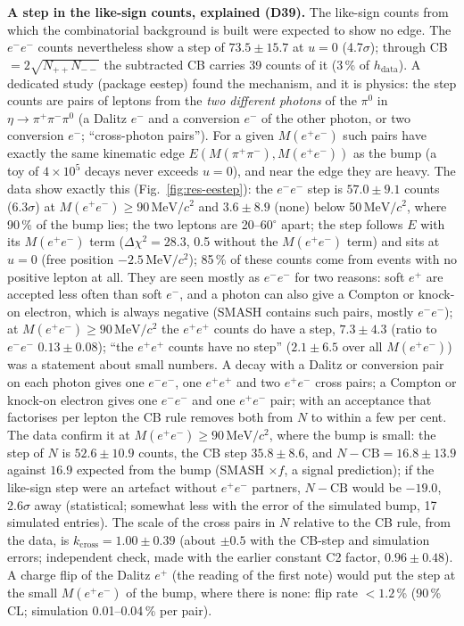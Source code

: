 \documentclass[11pt,a4paper]{article}
\newcommand{\piz}{\ensuremath{\pi^{0}}\xspace}
\newcommand{\pipi}{\ensuremath{\pi^{+}\pi^{-}}\xspace}
\newcommand{\Mee}{\ensuremath{M(e^{+}e^{-})}\xspace}
\newcommand{\Mpipi}{\ensuremath{M(\pi^{+}\pi^{-})}\xspace}
\newcommand{\MeVcc}{\ensuremath{\mathrm{MeV}/c^{2}}\xspace}
\begin{document}
\textbf{A step in the like-sign counts, explained (D39).} The like-sign counts from which the combinatorial background is built were expected to
show no edge. The $e^-e^-$ counts nevertheless show a step of $73.5\pm15.7$ at $u=0$ (4.7$\sigma$); through CB $=2\sqrt{N_{++}N_{--}}$ the
subtracted CB carries 39 counts of it (3\,\% of $h_{\mathrm{data}}$). A dedicated study (package eestep) found the mechanism, and it is physics:
the step counts are pairs of leptons from the \emph{two different photons} of the \piz in $\eta\to\pipi\piz$ (a Dalitz $e^-$ and a conversion
$e^-$ of the other photon, or two conversion $e^-$; ``cross-photon pairs''). For a given \Mee such pairs have exactly the same kinematic edge
$E(\Mpipi,\Mee)$ as the bump (a toy of $4\times10^5$ decays never exceeds $u=0$), and near the edge they are heavy. The data show exactly this
(Fig.~\ref{fig:res-eestep}): the $e^-e^-$ step is $57.0\pm9.1$ counts (6.3$\sigma$) at \Mee$\ge90$\,\MeVcc and $3.6\pm8.9$ (none) below
50\,\MeVcc, where 90\,\% of the bump lies; the two leptons are 20--60$^\circ$ apart; the step follows $E$ with its \Mee term ($\Delta\chi^2=28.3$,
0.5 without the \Mee term) and sits at $u=0$ (free position $-2.5$\,\MeVcc); 85\,\% of these counts come from events with no positive lepton at all.
They are seen mostly as $e^-e^-$ for two reasons: soft $e^+$ are accepted less often than soft $e^-$, and a photon can also give a Compton or
knock-on electron, which is always negative (SMASH contains such pairs, mostly $e^-e^-$); at \Mee$\ge90$\,\MeVcc the $e^+e^+$ counts do have a
step, $7.3\pm4.3$ (ratio to $e^-e^-$ $0.13\pm0.08$); ``the $e^+e^+$ counts have no step'' ($2.1\pm6.5$ over all \Mee) was a statement about
small numbers. A decay with a Dalitz or conversion pair on each photon
gives one $e^-e^-$, one $e^+e^+$ and two $e^+e^-$ cross pairs; a Compton or knock-on electron gives one $e^-e^-$ and one $e^+e^-$ pair; with
an acceptance that factorises per lepton the CB rule removes both from $N$ to within a few per cent. The data confirm
it at \Mee$\ge90$\,\MeVcc, where the bump is small: the step of $N$ is $52.6\pm10.9$ counts, the CB step $35.8\pm8.6$, and
$N-\mathrm{CB}=16.8\pm13.9$ against $16.9$ expected from the bump (SMASH $\times f$, a signal prediction); if the like-sign step were an artefact
without $e^+e^-$ partners, $N-\mathrm{CB}$ would be $-19.0$, 2.6$\sigma$ away (statistical; somewhat less with the error of the simulated bump,
17 simulated entries). The scale of the cross pairs in $N$ relative to the CB rule, from the data, is $k_{\mathrm{cross}}=1.00\pm0.39$ (about
$\pm0.5$ with the CB-step and simulation errors; independent check, made with the earlier constant C2 factor, $0.96\pm0.48$). A charge flip of the Dalitz $e^+$ (the reading of the first note) would put the step at the small \Mee of the
bump, where there is none: flip rate $<1.2$\,\% (90\,\% CL; simulation 0.01--0.04\,\% per pair).
\end{document}
